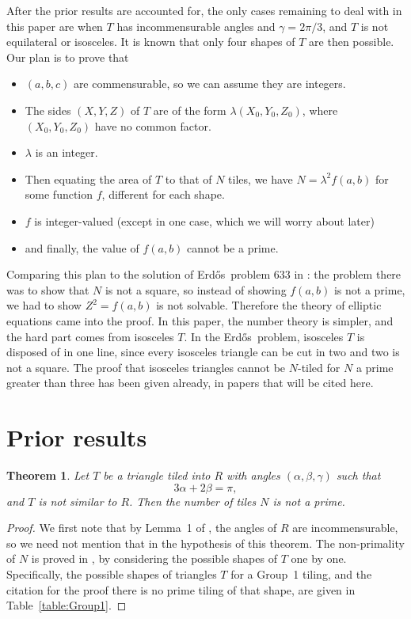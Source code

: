 \documentclass{amsart}
\def\Erdos{Erd\H{o}s}
\theoremstyle{plain}
\newtheorem{theorem}{Theorem}
\theoremstyle{definition}
\theoremstyle{remark}
\begin{document}
After the prior results are accounted for,  the only cases remaining to deal with in
this paper are when
$T$ has incommensurable angles and $\gamma = 2\pi/3$, and $T$ is not equilateral or isosceles.
 It is known that only four shapes
of $T$ are then possible.
Our plan is to prove that
\begin{itemize}
\item $(a,b,c)$ are commensurable, so we can assume they are integers.
\item The sides $(X,Y,Z)$ of $T$ are of the form $\lambda(X_0,Y_0,Z_0)$, where 
$(X_0,Y_0,Z_0)$ have no common factor.
\item $\lambda$ is an integer.
\item Then equating the area of $T$ to that of $N$ tiles, we have $N = \lambda^2 f(a,b)$ for
some function $f$, different for each shape.
\item $f$ is integer-valued (except in one case, which we will worry about later)
\item and finally, the value of $f(a,b)$ cannot be a prime.
\end{itemize}

Comparing this plan to the solution of \Erdos\ problem 633 in \cite{BLZ2026}:  the
problem there was to show that $N$ is not a square,  so instead of showing $f(a,b)$
is not a prime, we had to show $Z^2 = f(a,b)$ is not solvable.  Therefore the theory
of elliptic equations came into the proof.  In this paper, the number theory is
simpler, and the hard part comes from isosceles $T$.  In the \Erdos\ problem, 
isosceles $T$ is disposed of in one line, since every isosceles triangle can be
cut in two and two is not a square.  The proof that isosceles triangles
cannot be $N$-tiled for $N$ a prime greater than three has been given already,
in papers that will be cited here.  


\section{Prior results}
\begin{theorem} \label{theorem:triangletiling3}  Let $T$ be a triangle tiled into $R$
with  angles $(\alpha,\beta,\gamma)$ such that $$3\alpha + 2\beta = \pi,$$ and $T$
is not similar to $R$.
Then the number of tiles $N$ is not a prime.
\end{theorem}

\begin{proof} We first note that by Lemma~1 of \cite{beeson-triangletiling3},
the angles of $R$ are incommensurable, so we need not mention that in the 
hypothesis of this theorem.  The non-primality of $N$ is 
proved in \cite{beeson-triangletiling3}, by considering the 
possible shapes of $T$ one by one.   Specifically,
the possible shapes of triangles $T$ for a Group~1 tiling,  and the citation for 
the proof there is no prime tiling of that shape, are given in Table~\ref{table:Group1}. \qedhere
\end{proof}
\end{document}
